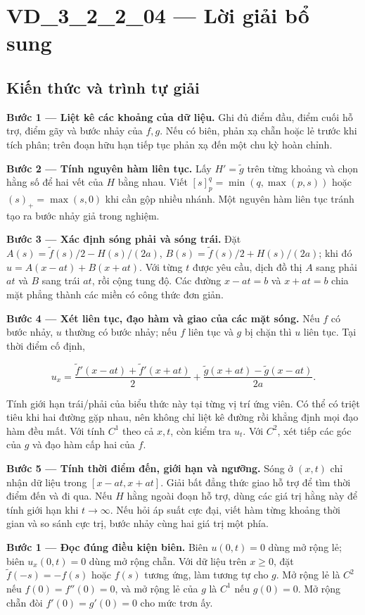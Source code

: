 \documentclass[10pt,a4paper]{article}
\begin{document}
\section*{VD\_3\_2\_2\_04 — Lời giải bổ sung}
\subsection*{Kiến thức và trình tự giải}
\textbf{Bước 1 — Liệt kê các khoảng của dữ liệu.} Ghi đủ điểm đầu, điểm cuối hỗ trợ, điểm gãy và bước nhảy của $f,g$. Nếu có biên, phản xạ chẵn hoặc lẻ trước khi tích phân; trên đoạn hữu hạn tiếp tục phản xạ đến một chu kỳ hoàn chỉnh.

\textbf{Bước 2 — Tính nguyên hàm liên tục.} Lấy $H'=\widetilde g$ trên từng khoảng và chọn hằng số để hai vết của $H$ bằng nhau. Viết $[s]_p^q=\min(q,\max(p,s))$ hoặc $(s)_+=\max(s,0)$ khi cần gộp nhiều nhánh. Một nguyên hàm liên tục tránh tạo ra bước nhảy giả trong nghiệm.

\textbf{Bước 3 — Xác định sóng phải và sóng trái.} Đặt $A(s)=\widetilde f(s)/2-H(s)/(2a)$, $B(s)=\widetilde f(s)/2+H(s)/(2a)$; khi đó $u=A(x-at)+B(x+at)$. Với từng $t$ được yêu cầu, dịch đồ thị $A$ sang phải $at$ và $B$ sang trái $at$, rồi cộng tung độ. Các đường $x-at=b$ và $x+at=b$ chia mặt phẳng thành các miền có công thức đơn giản.

\textbf{Bước 4 — Xét liên tục, đạo hàm và giao của các mặt sóng.} Nếu $f$ có bước nhảy, $u$ thường có bước nhảy; nếu $f$ liên tục và $g$ bị chặn thì $u$ liên tục. Tại thời điểm cố định,


\[
u_x=\frac{\widetilde f'(x-at)+\widetilde f'(x+at)}2+\frac{\widetilde g(x+at)-\widetilde g(x-at)}{2a}.
\]


Tính giới hạn trái/phải của biểu thức này tại từng vị trí ứng viên. Có thể có triệt tiêu khi hai đường gặp nhau, nên không chỉ liệt kê đường rồi khẳng định mọi đạo hàm đều mất. Với tính $C^1$ theo cả $x,t$, còn kiểm tra $u_t$. Với $C^2$, xét tiếp các góc của $g$ và đạo hàm cấp hai của $f$.

\textbf{Bước 5 — Tính thời điểm đến, giới hạn và ngưỡng.} Sóng ở $(x,t)$ chỉ nhận dữ liệu trong $[x-at,x+at]$. Giải bất đẳng thức giao hỗ trợ để tìm thời điểm đến và đi qua. Nếu $H$ hằng ngoài đoạn hỗ trợ, dùng các giá trị hằng này để tính giới hạn khi $t\to\infty$. Nếu hỏi áp suất cực đại, viết hàm từng khoảng thời gian và so sánh cực trị, bước nhảy cùng hai giá trị một phía.

\textbf{Bước 1 — Đọc đúng điều kiện biên.} Biên $u(0,t)=0$ dùng mở rộng lẻ; biên $u_x(0,t)=0$ dùng mở rộng chẵn. Với dữ liệu trên $x\ge0$, đặt $\widetilde f(-s)=-f(s)$ hoặc $f(s)$ tương ứng, làm tương tự cho $g$. Mở rộng lẻ là $C^2$ nếu $f(0)=f''(0)=0$, và mở rộng lẻ của $g$ là $C^1$ nếu $g(0)=0$. Mở rộng chẵn đòi $f'(0)=g'(0)=0$ cho mức trơn ấy.
\end{document}
